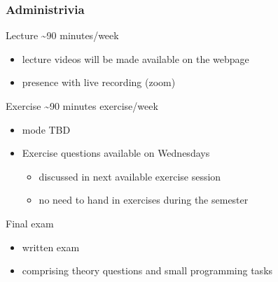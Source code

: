 \documentclass{beamer}
\begin{document}
\begin{frame}
  \frametitle{Administrivia}
  \begin{block}{Lecture \~{}90 minutes/week}
    \begin{itemize}
    \item lecture videos will be made available on the webpage
    \item presence with live recording (zoom)
    \end{itemize}
  \end{block}
  \begin{block}{Exercise  \~{}90 minutes exercise/week}
    \begin{itemize}
    \item mode TBD
    \item Exercise questions available on Wednesdays
    \begin{itemize}
    \item discussed in next available exercise session
    \item no need to hand in exercises during the semester
    \end{itemize}
  \end{itemize}
\end{block}
\begin{block}{Final exam}
  \begin{itemize}
  \item written exam
  \item comprising theory questions and small programming tasks
  \end{itemize}
\end{block}
\end{frame}

\end{document}
